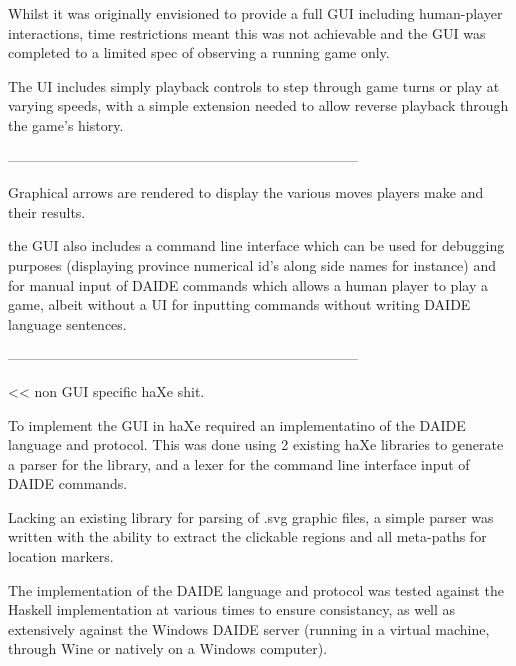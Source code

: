 \documentclass[pdftex,12pt,a4paper]{report}
\begin{document}
Whilst it was originally envisioned to provide a full GUI including human-player interactions, time restrictions meant this was not achievable and the GUI was completed to a limited spec of observing a running game only.

The UI includes simply playback controls to step through game turns or play at varying speeds, with a simple extension needed to allow reverse playback through the game's history.

---------------------------------------------------------------------------

Graphical arrows are rendered to display the various moves players make and their results.

the GUI also includes a command line interface which can be used for debugging purposes (displaying province numerical id's along side names for instance) and for manual input of DAIDE commands which allows a human player to play a game, albeit without a UI for inputting commands without writing DAIDE language sentences. 

---------------------------------------------------------------------------

<< non GUI specific haXe shit.

To implement the GUI in haXe required an implementatino of the DAIDE language and protocol. This was done using 2 existing haXe libraries to generate a parser for the library, and a lexer for the command line interface input of DAIDE commands. 

Lacking an existing library for parsing of .svg graphic files, a simple parser was written with the ability to extract the clickable regions and all meta-paths for location markers.

The implementation of the DAIDE language and protocol was tested against the Haskell implementation at various times to ensure consistancy, as well as extensively against the Windows DAIDE server (running in a virtual machine, through Wine or natively on a Windows computer).
\end{document}
